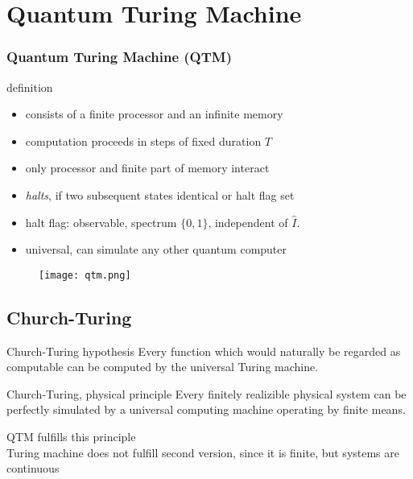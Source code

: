 \documentclass{beamer}
\begin{document}
\section{Quantum Turing Machine}
%
\begin{frame}
 \tableofcontents
\end{frame}
\begin{frame}
	\frametitle{Quantum Turing Machine (QTM)}
	\begin{block}{definition}
	    \begin{itemize}
			\item consists of a finite processor and an infinite memory
			\item computation proceeds in steps of fixed duration $T$
			\item only processor and finite part of memory interact
			\item \emph{halts}, if two subsequent states identical or halt flag set
			\item halt flag: observable, spectrum $\{0,1\}$, independent of $\hat{I}$.
			\item universal, can simulate any other quantum computer
		\end{itemize}
	\end{block}
	\begin{figure}
		\texttt{[image: qtm.png]}
	\end{figure}
\end{frame}
%
\subsection{Church-Turing}
\begin{frame}
    \begin{block}{Church-Turing hypothesis}
        Every function which would naturally be regarded as computable can be computed by the universal Turing machine.
    \end{block}
    \begin{block}{Church-Turing, physical principle}
        Every finitely realizible physical system can be perfectly simulated by a universal computing machine operating by finite means.
    \end{block}
    QTM fulfills this principle\\
	Turing machine does not fulfill second version, since it is finite, but systems are continuous
\end{frame}
%
\end{document}
